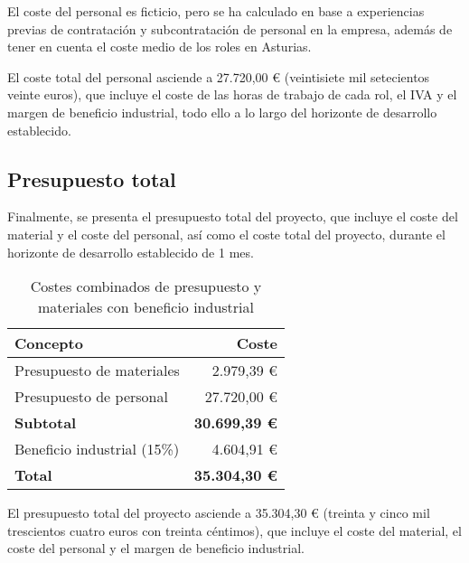 El coste del personal es ficticio, pero se ha calculado en base a experiencias
previas de contratación y subcontratación de personal en la empresa, además de
tener en cuenta el coste medio de los roles en Asturias.

El coste total del personal asciende a 27.720,00 € (veintisiete mil setecientos
veinte euros), que incluye el coste de las horas de trabajo de cada rol,
el IVA y el margen de beneficio industrial, todo ello a lo largo del horizonte
de desarrollo establecido.


\newpage{}
\subsection{Presupuesto total}\label{subsec:pres_total}
Finalmente, se presenta el presupuesto total del proyecto, que incluye el coste
del material y el coste del personal, así como el coste total del proyecto,
durante el horizonte de desarrollo establecido de 1 mes.

\begin{table}[H]
	\centering
	\small
	\begin{tabular}{|l|r|}
	\hline
	\textbf{Concepto} & \textbf{Coste} \\
	\hline
	Presupuesto de materiales & 2.979,39 € \\
	\hline
	Presupuesto de personal & 27.720,00 € \\
	\hline
	\textbf{Subtotal} & \textbf{30.699,39 €} \\
	\hline
	\hline
	Beneficio industrial (15\%) & 4.604,91 € \\
	\hline
	\textbf{Total} & \textbf{35.304,30 €} \\
	\hline
	\end{tabular}
	\caption{Costes combinados de presupuesto y materiales con beneficio industrial}
	\label{tab:costes_combinados}
\end{table}

El presupuesto total del proyecto asciende a 35.304,30 € (treinta y cinco mil
trescientos cuatro euros con treinta céntimos), que incluye el coste del
material, el coste del personal y el margen de beneficio industrial.
